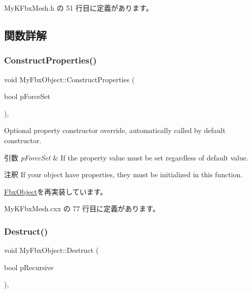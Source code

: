  My\+K\+Fbx\+Mesh.\+h の 51 行目に定義があります。



\subsection{関数詳解}
\mbox{\label{class_my_fbx_object_ac56c33fb1ab6c49ac48346ef64e7c80a}} 
\subsubsection{\texorpdfstring{Construct\+Properties()}{ConstructProperties()}}
{\footnotesize\ttfamily void My\+Fbx\+Object\+::\+Construct\+Properties (\begin{DoxyParamCaption}\item[{bool}]{p\+Force\+Set }\end{DoxyParamCaption})\hspace{0.3cm}{\ttfamily [protected]}, {\ttfamily [virtual]}}

Optional property constructor override, automatically called by default constructor. 
\begin{DoxyParams}{引数}
{\em p\+Force\+Set} & If the property value must be set regardless of default value. \\
\hline
\end{DoxyParams}
\begin{DoxyRemark}{注釈}
If your object have properties, they must be initialized in this function. 
\end{DoxyRemark}


\hyperlink{class_fbx_object_ad44f814323dc1b5e78bff1bfc608b4bb}{Fbx\+Object}を再実装しています。



 My\+K\+Fbx\+Mesh.\+cxx の 77 行目に定義があります。

\mbox{\label{class_my_fbx_object_a4681d1f595d173c9db3835b34365d787}} 
\subsubsection{\texorpdfstring{Destruct()}{Destruct()}}
{\footnotesize\ttfamily void My\+Fbx\+Object\+::\+Destruct (\begin{DoxyParamCaption}\item[{bool}]{p\+Recursive }\end{DoxyParamCaption})\hspace{0.3cm}{\ttfamily [protected]}, {\ttfamily [virtual]}}

